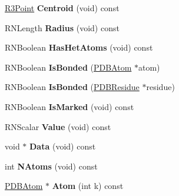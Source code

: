 \begin{DoxyCompactItemize}
\item 
\hyperlink{class_r3_point}{R3\+Point} {\bfseries Centroid} (void) const \hypertarget{class_p_d_b_residue_ae8b8fea5a311b5cb106f2a6c48e2bc30}{}\label{class_p_d_b_residue_ae8b8fea5a311b5cb106f2a6c48e2bc30}

\item 
R\+N\+Length {\bfseries Radius} (void) const \hypertarget{class_p_d_b_residue_a8cd22bec26c2a287b0f6d001c642821e}{}\label{class_p_d_b_residue_a8cd22bec26c2a287b0f6d001c642821e}

\item 
R\+N\+Boolean {\bfseries Has\+Het\+Atoms} (void) const \hypertarget{class_p_d_b_residue_a72ed702dd5f06515cdb0fdda30c951cc}{}\label{class_p_d_b_residue_a72ed702dd5f06515cdb0fdda30c951cc}

\item 
R\+N\+Boolean {\bfseries Is\+Bonded} (\hyperlink{class_p_d_b_atom}{P\+D\+B\+Atom} $\ast$atom)\hypertarget{class_p_d_b_residue_a6b1579a3efed89f60949adde27c29dd8}{}\label{class_p_d_b_residue_a6b1579a3efed89f60949adde27c29dd8}

\item 
R\+N\+Boolean {\bfseries Is\+Bonded} (\hyperlink{class_p_d_b_residue}{P\+D\+B\+Residue} $\ast$residue)\hypertarget{class_p_d_b_residue_afc2a281a34c00809fc1014d0fddafcaf}{}\label{class_p_d_b_residue_afc2a281a34c00809fc1014d0fddafcaf}

\item 
R\+N\+Boolean {\bfseries Is\+Marked} (void) const \hypertarget{class_p_d_b_residue_a2ae2871edb3f07f8f3e93f86616b5334}{}\label{class_p_d_b_residue_a2ae2871edb3f07f8f3e93f86616b5334}

\item 
R\+N\+Scalar {\bfseries Value} (void) const \hypertarget{class_p_d_b_residue_a77abf56f2ecb566eed21854e46e7c8c0}{}\label{class_p_d_b_residue_a77abf56f2ecb566eed21854e46e7c8c0}

\item 
void $\ast$ {\bfseries Data} (void) const \hypertarget{class_p_d_b_residue_a766edc3639907131d12fda1ddcd62139}{}\label{class_p_d_b_residue_a766edc3639907131d12fda1ddcd62139}

\item 
int {\bfseries N\+Atoms} (void) const \hypertarget{class_p_d_b_residue_a57f731be5fced0cb091efe671ed41550}{}\label{class_p_d_b_residue_a57f731be5fced0cb091efe671ed41550}

\item 
\hyperlink{class_p_d_b_atom}{P\+D\+B\+Atom} $\ast$ {\bfseries Atom} (int k) const \hypertarget{class_p_d_b_residue_a52769ae4461f22dff4e9c2f94b0efaa9}{}\label{class_p_d_b_residue_a52769ae4461f22dff4e9c2f94b0efaa9}


\end{DoxyCompactItemize}
